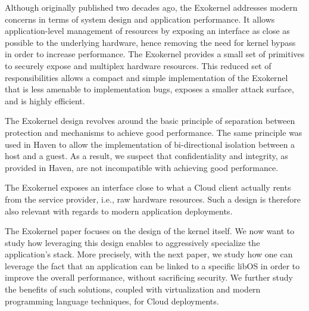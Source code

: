 Although originally published two decades ago, the Exokernel addresses modern concerns in terms of system design and application performance.
It allows application-level management of resources by exposing an interface as close as possible to the underlying hardware, hence removing the need for kernel bypass in order to increase performance\cite{BelayPKGKB14,DBLP:journals/tocs/CaoFKL96}.
The Exokernel provides a small set of primitives to securely expose and multiplex hardware resources.
This reduced set of responsibilities allows a compact and simple implementation of the Exokernel that is less amenable to implementation bugs, exposes a smaller attack surface, and is highly efficient.

The Exokernel design revolves around the basic principle of separation between protection and mechanisms to achieve good performance.
The same principle was used in Haven to allow the implementation of bi-directional isolation between a host and a guest.
As a result, we suspect that confidentiality and integrity, as provided in Haven, are not incompatible with achieving good performance.

The Exokernel exposes an interface close to what a Cloud client actually rents from the service provider, i.e., raw hardware resources.
Such a design is therefore also relevant with regards to modern application deployments. 

The Exokernel paper focuses on the design of the kernel itself.
We now want to study how leveraging this design enables to aggressively specialize the application's stack.
More precisely, with the next paper, we study how one can leverage the fact that an application can be linked to a specific libOS in order to improve the overall performance, without sacrificing security.
We further study the benefits of such solutions, coupled with virtualization and modern programming language techniques, for Cloud deployments.